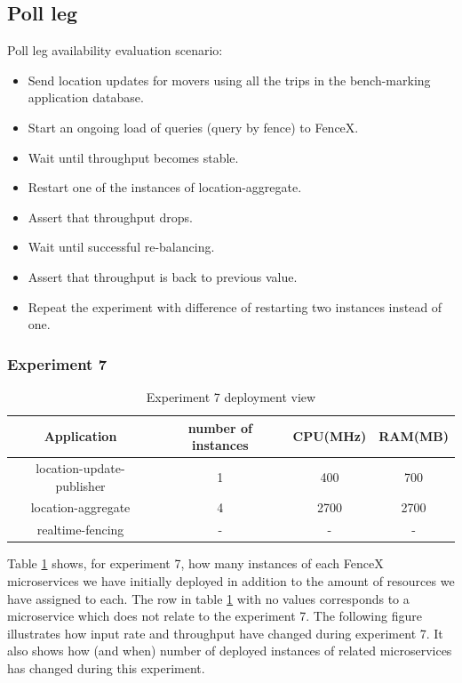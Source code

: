 \documentclass[a4]{report}
\begin{document}
    \subsection{Poll leg}
    Poll leg availability evaluation scenario:
    \begin{itemize}
        \item[1-] Send location updates for movers using all the trips in the bench-marking application database.
        \item[2-] Start an ongoing load of queries (query by fence) to FenceX.
        \item[3-] Wait until throughput becomes stable.
        \item[4-] Restart one of the instances of location-aggregate.
        \item[5-] Assert that throughput drops.
        \item[6-] Wait until successful re-balancing.
        \item[7-] Assert that throughput is back to previous value.
        \item[8-] Repeat the experiment with difference of restarting two instances instead of one.
    \end{itemize}

    \clearpage

    \subsubsection{Experiment 7}
    \begin{table}[h!]
        \centering
        \begin{tabular}{|c|c|c|c|}
            \hline
            Application               & number of instances & CPU(MHz) & RAM(MB) \\
            \hline
            location-update-publisher & 1                   & 400      & 700     \\
            location-aggregate        & 4                   & 2700     & 2700    \\
            realtime-fencing          & -                   & -        & -       \\
            \hline
        \end{tabular}
        \caption{Experiment 7 deployment view}
        \label{table:ex7-dv}
    \end{table}

    Table \ref{table:ex7-dv} shows, for experiment 7, how many instances of each FenceX microservices we have initially
    deployed in addition to the amount of resources we have assigned to each.
    The row in table \ref{table:ex7-dv} with no values corresponds to a microservice which does not relate to the
    experiment 7.
    The following figure illustrates how input rate and throughput have changed during experiment 7.
    It also shows how (and when) number of deployed instances of related microservices has changed during this
    experiment.
\end{document}
